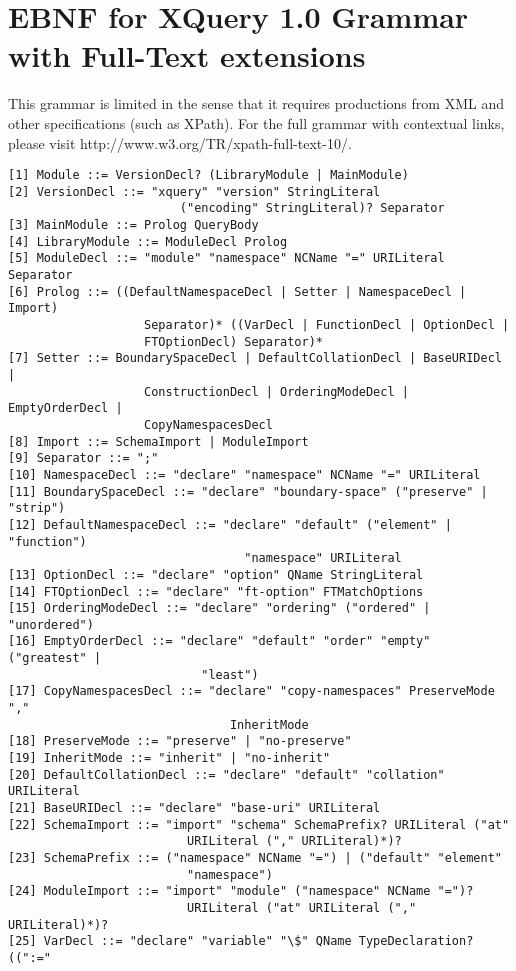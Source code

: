 \chapter{EBNF for XQuery 1.0 Grammar with Full-Text extensions}
This grammar is limited in the sense that it requires productions from XML and
other specifications (such as XPath). For the full grammar with contextual
links, please visit http://www.w3.org/TR/xpath-full-text-10/. 

\begin{verbatim}
[1] Module ::= VersionDecl? (LibraryModule | MainModule)
[2] VersionDecl ::= "xquery" "version" StringLiteral 
                        ("encoding" StringLiteral)? Separator
[3] MainModule ::= Prolog QueryBody
[4] LibraryModule ::= ModuleDecl Prolog
[5] ModuleDecl ::= "module" "namespace" NCName "=" URILiteral Separator
[6] Prolog ::= ((DefaultNamespaceDecl | Setter | NamespaceDecl | Import)
                   Separator)* ((VarDecl | FunctionDecl | OptionDecl |
                   FTOptionDecl) Separator)*
[7] Setter ::= BoundarySpaceDecl | DefaultCollationDecl | BaseURIDecl |
                   ConstructionDecl | OrderingModeDecl | EmptyOrderDecl |
                   CopyNamespacesDecl 
[8] Import ::= SchemaImport | ModuleImport 
[9] Separator ::= ";"
[10] NamespaceDecl ::= "declare" "namespace" NCName "=" URILiteral
[11] BoundarySpaceDecl ::= "declare" "boundary-space" ("preserve" | "strip")
[12] DefaultNamespaceDecl ::= "declare" "default" ("element" | "function")
                                 "namespace" URILiteral
[13] OptionDecl ::= "declare" "option" QName StringLiteral
[14] FTOptionDecl ::= "declare" "ft-option" FTMatchOptions
[15] OrderingModeDecl ::= "declare" "ordering" ("ordered" | "unordered")
[16] EmptyOrderDecl ::= "declare" "default" "order" "empty" ("greatest" |
                           "least")
[17] CopyNamespacesDecl ::= "declare" "copy-namespaces" PreserveMode ","
                               InheritMode 
[18] PreserveMode ::= "preserve" | "no-preserve" 
[19] InheritMode ::= "inherit" | "no-inherit"
[20] DefaultCollationDecl ::= "declare" "default" "collation" URILiteral
[21] BaseURIDecl ::= "declare" "base-uri" URILiteral
[22] SchemaImport ::= "import" "schema" SchemaPrefix? URILiteral ("at"
                         URILiteral ("," URILiteral)*)?
[23] SchemaPrefix ::= ("namespace" NCName "=") | ("default" "element"
                         "namespace")
[24] ModuleImport ::= "import" "module" ("namespace" NCName "=")?
                         URILiteral ("at" URILiteral ("," URILiteral)*)?
[25] VarDecl ::= "declare" "variable" "\$" QName TypeDeclaration? ((":="

\end{verbatim}
